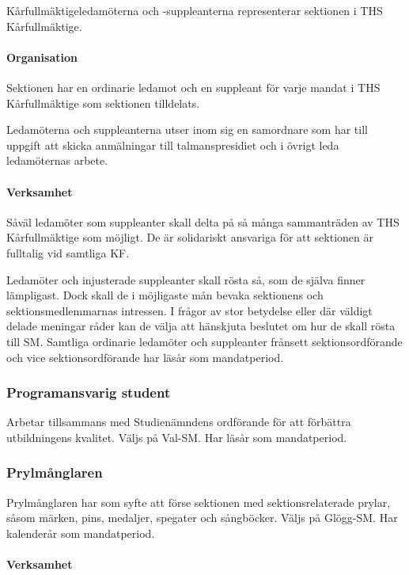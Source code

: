 \documentclass{dgovdoc}
\begin{document}
Kårfullmäktigeledamöterna och -suppleanterna representerar sektionen i THS Kårfullmäktige.

\paragraph{Organisation}

Sektionen har en ordinarie ledamot och en suppleant för varje mandat i THS Kårfullmäktige som sektionen tilldelats.

Ledamöterna och suppleanterna utser inom sig en samordnare som har till uppgift att skicka anmälningar till talmanspresidiet och i övrigt leda ledamöternas arbete.

\paragraph{Verksamhet}

Såväl ledamöter som suppleanter skall delta på så många sammanträden av THS Kårfullmäktige som möjligt. De är solidariskt ansvariga för att sektionen är fulltalig vid samtliga KF.

Ledamöter och injusterade suppleanter skall rösta så, som de själva finner lämpligast. Dock skall de i möjligaste mån bevaka sektionens och sektionsmedlemmarnas intressen. I frågor av stor betydelse eller där väldigt delade meningar råder kan de välja att hänskjuta beslutet om hur de skall rösta till SM. Samtliga ordinarie ledamöter och suppleanter frånsett sektionsordförande och vice sektionsordförande har läsår som mandatperiod.

\subsubsection{Programansvarig student}

Arbetar tillsammans med Studienämndens ordförande för att förbättra utbildningens kvalitet. Väljs på Val-SM. Har läsår som mandatperiod.

\subsubsection{Prylmånglaren}

Prylmånglaren har som syfte att förse sektionen med sektionsrelaterade prylar, såsom märken, pins, medaljer, spegater och sångböcker. Väljs på Glögg-SM. Har kalenderår som mandatperiod.

\paragraph{Verksamhet}
\end{document}
